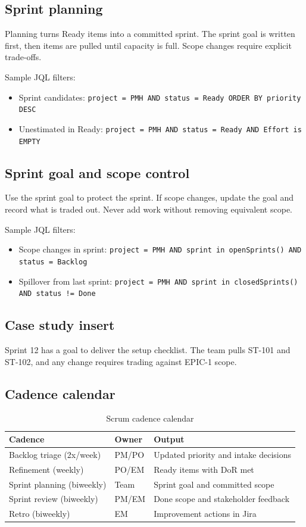 \subsection{Sprint planning}
Planning turns Ready items into a committed sprint. The sprint goal is written first, then items are pulled until capacity is full. Scope changes require explicit trade-offs.

Sample JQL filters:
\begin{itemize}
  \item Sprint candidates: \texttt{project = PMH AND status = Ready ORDER BY priority DESC}
  \item Unestimated in Ready: \texttt{project = PMH AND status = Ready AND Effort is EMPTY}
\end{itemize}

\subsection{Sprint goal and scope control}
Use the sprint goal to protect the sprint. If scope changes, update the goal and record what is traded out. Never add work without removing equivalent scope.

Sample JQL filters:
\begin{itemize}
  \item Scope changes in sprint: \texttt{project = PMH AND sprint in openSprints() AND status = Backlog}
  \item Spillover from last sprint: \texttt{project = PMH AND sprint in closedSprints() AND status != Done}
\end{itemize}

\subsection{Case study insert}
Sprint 12 has a goal to deliver the setup checklist. The team pulls ST-101 and ST-102, and any change requires trading against EPIC-1 scope.
\subsection{Cadence calendar}
\begin{table}[h]
\centering
\caption{Scrum cadence calendar}
\label{tab:scrum-cadence}
\begin{tabular}{p{4cm}p{4cm}p{6cm}}
\toprule
Cadence & Owner & Output \\
\midrule
Backlog triage (2x/week) & PM/PO & Updated priority and intake decisions \\
Refinement (weekly) & PO/EM & Ready items with DoR met \\
Sprint planning (biweekly) & Team & Sprint goal and committed scope \\
Sprint review (biweekly) & PM/EM & Done scope and stakeholder feedback \\
Retro (biweekly) & EM & Improvement actions in Jira \\
\bottomrule
\end{tabular}
\end{table}










